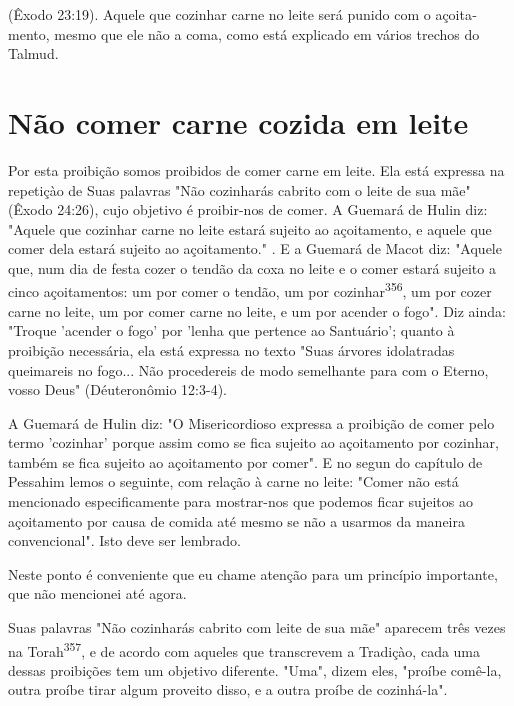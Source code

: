 \begin{itemize}
\begin{enumrate}
\begin{itemize}
\begin{itemize}
\begin{itemize}
(Êxodo 23:19). Aquele que cozinhar carne no leite será punido com o
açoita­mento, mesmo que ele não a coma, como está explicado em vários
trechos do Talmud.

\section{Não comer carne cozida em leite}

Por esta proibição somos proibidos de comer carne em leite. Ela es­tá
expressa na repetiçào de Suas palavras "Não cozinharás cabrito com o
leite de sua mãe" (Êxodo 24:26), cujo objetivo é proibir-nos de comer. A
Guemará de Hulin diz: "Aquele que cozinhar carne no leite estará sujeito
ao açoitamen­to, e aquele que comer dela estará sujeito ao açoitamento."
. E a Guemará de Macot diz: "Aquele que, num dia de festa cozer o tendão
da coxa no leite e o comer estará sujeito a cinco açoitamentos: um por
comer o tendão, um por cozinhar\textsuperscript{356}, um por cozer carne
no leite, um por comer carne no leite, e um por acender o fogo". Diz
ainda: "Troque 'acender o fogo' por 'lenha que per­tence ao Santuário';
quanto à proibição necessária, ela está expressa no texto "Suas árvores
idolatradas queimareis no fogo... Não procedereis de modo se­melhante
para com o Eterno, vosso Deus" (Déuteronômio 12:3-4).

A Guemará de Hulin diz: "O Misericordioso expressa a proibição de comer
pelo termo 'cozinhar' porque assim como se fica sujeito ao açoitamento
por cozinhar, também se fica sujeito ao açoitamento por comer". E no
segun do capítulo de Pessahim lemos o seguinte, com relação à carne no
leite: "Co­mer não está mencionado especificamente para mostrar-nos que
podemos fi­car sujeitos ao açoitamento por causa de comida até mesmo se
não a usarmos da maneira convencional". Isto deve ser lembrado.

Neste ponto é conveniente que eu chame atenção para um princípio
importante, que não mencionei até agora.

Suas palavras "Não cozinharás cabrito com leite de sua mãe" apare­cem
três vezes na Torah\textsuperscript{357}, e de acordo com aqueles que
transcrevem a Tra­diçào, cada uma dessas proibições tem um objetivo
diferente. "Uma", dizem eles, "proíbe comê-la, outra proíbe tirar algum
proveito disso, e a outra proíbe de cozinhá-la".


\end{itemize}
\end{itemize}
\end{itemize}
\end{enumrate}
\end{itemize}
